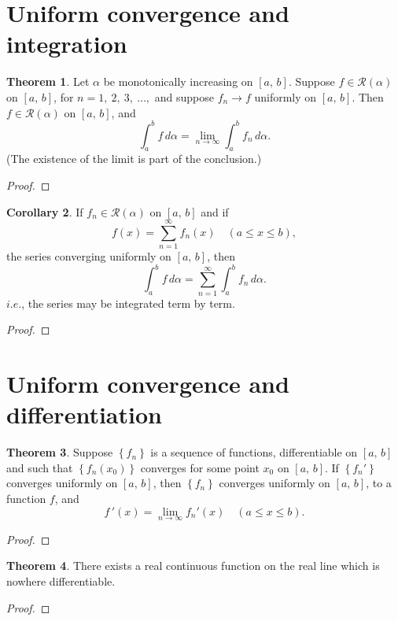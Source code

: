 \documentclass[12pt]{book}
\theoremstyle{definition}
\newtheorem{theorem}{Theorem}[chapter]
\newtheorem{corollary}[theorem]{Corollary}
\begin{document}
	\section*{Uniform convergence and integration}
	\begin{theorem}
		Let $\alpha$ be monotonically increasing on $[a,\,b]$. Suppose $f\in\mathscr{R}(\alpha)$ on $[a,\,b]$, for $n=1,~2,~3,~\ldots,$ and suppose $f_n\rightarrow f$ uniformly on $[a,\,b]$. Then $f\in\mathscr{R}(\alpha)$ on $[a,\,b]$, and $$\int_{a}^{b}f\,d\alpha=\lim_{n\rightarrow\infty} \int_{a}^{b} f_n\,d\alpha.$$ (The existence of the limit is part of the conclusion.)
	\end{theorem}
	\begin{proof}
	\end{proof}
	\vfill
	\begin{corollary}
		If $f_n\in\mathscr{R}(\alpha)$ on $[a,\,b]$ and if $$f(x)=\displaystyle\sum_{n=1}^\infty f_n(x)\quad (a\leq x\leq b),$$ the series converging uniformly on $[a,\,b]$, then $$\int_{a}^{b} f\,d\alpha =\displaystyle\sum_{n=1}^\infty \int_{a}^{b} f_n\,d\alpha.$$$i.e.$, the series may be integrated term by term.
	\end{corollary}
	\begin{proof}
	\end{proof}
	\newpage
	\section*{Uniform convergence and differentiation}
	\begin{theorem}
		Suppose $\left\{f_n\right\}$ is a sequence of functions, differentiable on $[a,\,b]$ and such that $\left\{f_n(x_0)\right\}$ converges for some point $x_0$ on $[a,\,b]$. If $\left\{f_n'\right\}$ converges uniformly on $[a,\,b]$, then $\left\{f_n\right\}$ converges uniformly on $[a,\,b]$, to a function $f$, and $$f\,'(x)=\lim_{n\rightarrow\infty}f_n'(x)\quad(a\leq x\leq b).$$
	\end{theorem}
	\begin{proof}
	\end{proof}
	\newpage
	\begin{theorem}
		There exists a real continuous function on the real line which is nowhere differentiable.
	\end{theorem}
	\begin{proof}
	\end{proof}
	\newpage
\end{document}

